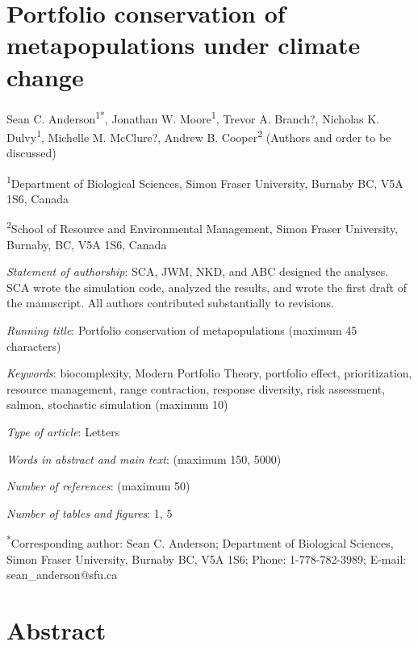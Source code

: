 \section{Portfolio conservation of metapopulations under climate change}

\setlength{\parskip}{6pt} \setlength{\parindent}{0cm}

Sean C. Anderson\textsuperscript{1*}, Jonathan W. Moore\textsuperscript{1}, Trevor A. Branch?, Nicholas K. Dulvy\textsuperscript{1}, Michelle M. McClure?, Andrew B. Cooper\textsuperscript{2} (Authors and order to be discussed)

\textsuperscript{1}Department of Biological Sciences, Simon Fraser University, Burnaby BC, V5A 1S6, Canada

\textsuperscript{2}School of Resource and Environmental Management, Simon Fraser University, Burnaby, BC, V5A 1S6, Canada

\emph{Statement of authorship}: SCA, JWM, NKD, and ABC designed the analyses. SCA wrote the simulation code, analyzed the results, and wrote the first draft of the manuscript. All authors contributed substantially to revisions.

\emph{Running title}: Portfolio conservation of metapopulations (maximum 45 characters)

\emph{Keywords}: biocomplexity, Modern Portfolio Theory, portfolio effect, prioritization, resource management, range contraction, response diversity, risk assessment, salmon, stochastic simulation (maximum 10)

\emph{Type of article}: Letters

\emph{Words in abstract and main text}: (maximum 150, 5000)

\emph{Number of references}: (maximum 50)

\emph{Number of tables and figures}: 1, 5

\textsuperscript{*}Corresponding author: Sean C. Anderson; Department of Biological Sciences, Simon Fraser University, Burnaby BC, V5A 1S6; Phone: 1-778-782-3989; E-mail: sean\_anderson@sfu.ca

\setlength{\parskip}{2pt} \setlength{\parindent}{16pt}

\section{Abstract}

